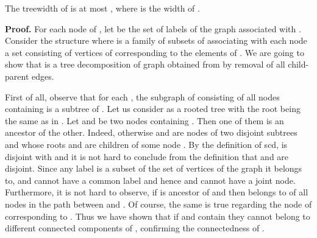 \documentclass{llncs}
\begin{document}
\begin{comment}
{\bf Proof.}
Let  be an undirected graph obtained from  as follows.
For each label, replace all the associated gates by one vertex.
Vertices corresponding to different labels  and 
are adjacent if and only there is a wire between a gate corresponding to
 and a gate corresponding to . It is not hard to see that
 is isomorphic to . Indeed, consider a natural correspondence under 
which vertex  is mapped into vertex  corresponding to the same
label. It follows that  is adjacent to  if and only if  is adjacent to .
Indeed,  is adjacent to  if and only if the new adjacency operation is applied 
on the corresponding labels or these labels are in a child-parent relation.
On the other hand  and  are adjacent if and only if there is a wire between
the gates of the corresponding labels. But the wire appears due to exactly the same 
reasons as the edge between  and . So, the isomorphism has been established.

It follows that  has  tree decomposition of size  or, that each bag of this 
decomposition consists of at most  elements. In each bag replace each vertex 
of  with the at most  gates of  corresponding to the same label. It is straightforward
to see that the resulting structure is a tree decomposition of . It contains at most
 bags in each label and therefore the treewidth of  is at most .

\end{comment}

\begin{lemma} \label{widthh}
The treewidth of  is at most ,
where  is the width of . 
\end{lemma}

{\bf Proof.}
For each node  of , let  be the set of labels of the graph
associated with . Consider the structure  where
 is a family of subsets of  associating with each node
 a set  consisting of vertices of  corresponding to the 
elements of . We are going to show that  is a tree
decomposition of graph  obtained from  by removal of all child-parent
edges.


First of all, observe that for each , the subgraph  of 
consisting of all nodes containing  is a subtree of . 
Let us consider  as a rooted tree
with the root  being the same as in .
Let  and  be two nodes containing . Then one of them
is an ancestor of the other. Indeed, otherwise  and  are nodes of two disjoint
subtrees  and  whose roots  and  are children of some node .
By the definition of {\sc scd},  is disjoint with  and it is
not hard to conclude from the definition that  and 
 are disjoint. Since any label is a subset of the set of vertices of 
the graph it belongs to,  and  cannot have a common label and hence
 and  cannot have a joint node. 
Furthermore, it is not hard to observe, if  is ancestor of  and  
then  belongs to  of all nodes  in the path between  and . Of course, the same
is true regarding the node of  corresponding to .
Thus we have shown that if  and  contain  they cannot belong to different 
connected components of , confirming the connectedness of .
\end{document}
